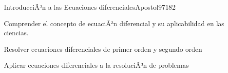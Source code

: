 \begin{syllabus}
\begin{unit}{IntroducciÃ³n a las Ecuaciones diferenciales}{Apostol97}{18}{2}
   \begin{unitgoals}
      \item Comprender el concepto de ecuaciÃ³n diferencial y su aplicabilidad en las ciencias.
      \item Resolver ecuaciones diferenciales de primer orden y segundo orden
      \item Aplicar ecuaciones diferenciales a la resoluciÃ³n de problemas
      \end{unitgoals}
\end{unit}



\begin{coursebibliography}
\end{coursebibliography}

\end{syllabus}
